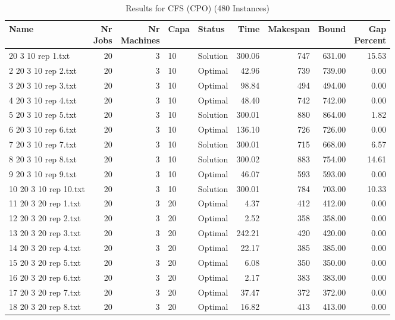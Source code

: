 \begin{longtable}{lrrllrrrr}
\caption{Results for CFS (CPO) (480 Instances)}\\\toprule
Name & \shortstack{Nr\\Jobs} & \shortstack{Nr\\Machines} & Capa & Status  & Time & Makespan & Bound & \shortstack{Gap\\Percent}\\ \midrule
\endhead
\bottomrule
\endfoot
1 20 3 10 rep 1.txt & 20 & 3 & 10 & Solution & 300.06 & 747 & 631.00 & 15.53\\
2 20 3 10 rep 2.txt & 20 & 3 & 10 & Optimal & 42.96 & 739 & 739.00 &  0.00\\
3 20 3 10 rep 3.txt & 20 & 3 & 10 & Optimal & 98.84 & 494 & 494.00 &  0.00\\
4 20 3 10 rep 4.txt & 20 & 3 & 10 & Optimal & 48.40 & 742 & 742.00 &  0.00\\
5 20 3 10 rep 5.txt & 20 & 3 & 10 & Solution & 300.01 & 880 & 864.00 &  1.82\\
6 20 3 10 rep 6.txt & 20 & 3 & 10 & Optimal & 136.10 & 726 & 726.00 &  0.00\\
7 20 3 10 rep 7.txt & 20 & 3 & 10 & Solution & 300.01 & 715 & 668.00 &  6.57\\
8 20 3 10 rep 8.txt & 20 & 3 & 10 & Solution & 300.02 & 883 & 754.00 & 14.61\\
9 20 3 10 rep 9.txt & 20 & 3 & 10 & Optimal & 46.07 & 593 & 593.00 &  0.00\\
10 20 3 10 rep 10.txt & 20 & 3 & 10 & Solution & 300.01 & 784 & 703.00 & 10.33\\
11 20 3 20 rep 1.txt & 20 & 3 & 20 & Optimal &  4.37 & 412 & 412.00 &  0.00\\
12 20 3 20 rep 2.txt & 20 & 3 & 20 & Optimal &  2.52 & 358 & 358.00 &  0.00\\
13 20 3 20 rep 3.txt & 20 & 3 & 20 & Optimal & 242.21 & 420 & 420.00 &  0.00\\
14 20 3 20 rep 4.txt & 20 & 3 & 20 & Optimal & 22.17 & 385 & 385.00 &  0.00\\
15 20 3 20 rep 5.txt & 20 & 3 & 20 & Optimal &  6.08 & 350 & 350.00 &  0.00\\
16 20 3 20 rep 6.txt & 20 & 3 & 20 & Optimal &  2.17 & 383 & 383.00 &  0.00\\
17 20 3 20 rep 7.txt & 20 & 3 & 20 & Optimal & 37.47 & 372 & 372.00 &  0.00\\
18 20 3 20 rep 8.txt & 20 & 3 & 20 & Optimal & 16.82 & 413 & 413.00 &  0.00\\

\end{longtable}
